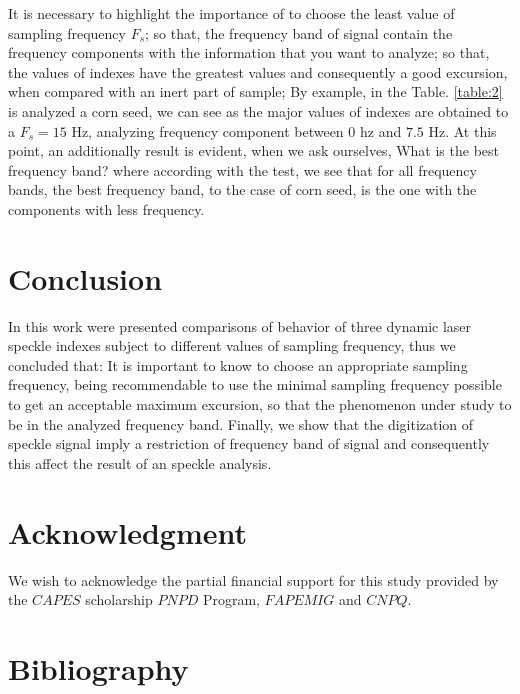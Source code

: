 \documentclass[review]{elsarticle}
\begin{document}
It is necessary to highlight the importance of to choose the least value of sampling frequency $F_s$;
so that, 
the frequency band of signal contain the frequency components with the information that you want to analyze;
so that, the values of indexes have the greatest values and consequently a good excursion, 
when compared with an inert part of sample; 
By example, in the Table. \ref{table:2} is analyzed a corn seed, 
we can see as the major values of indexes are obtained to a $F_s=15$ Hz, 
analyzing frequency component between $0$ hz and $7.5$ Hz. At this point,
an additionally result is evident, when we ask ourselves, 
What is the best frequency band? where according with the test, we see that for
all frequency bands, 
the best frequency band, to the case of corn seed, is the one with the components with less frequency.
 

\section{Conclusion} 

In this work were presented comparisons of behavior of three dynamic laser speckle indexes
subject to different values of sampling frequency, thus we concluded that:
It is important to know to choose an appropriate sampling frequency, 
being recommendable to use the minimal sampling frequency possible to get an acceptable maximum excursion,
so that the phenomenon under study to be in the analyzed frequency band.
Finally, 
we show that the digitization  of speckle signal imply a restriction of frequency 
band of signal and consequently this affect the result of an speckle analysis.


\section{Acknowledgment}
We wish to acknowledge the partial financial support for this study provided by the $CAPES$ 
scholarship
$PNPD$ Program, $FAPEMIG$ and $CNPQ$.


\section{Bibliography}
\end{document}
